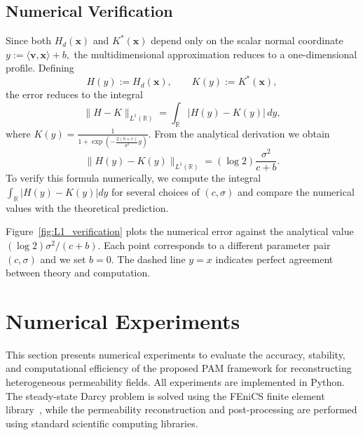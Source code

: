 \documentclass[final,1p,times]{elsarticle}
\theoremstyle{plain}
\theoremstyle{definition}
\theoremstyle{remark}
\newcommand{\bx}{\mathbf{x}}
\newcommand{\bv}{\mathbf{v}}
\begin{document}
\subsection{Numerical Verification}
Since both $H_d(\bx)$ and $K^*(\bx)$ depend only on the scalar normal coordinate $y := \langle \bv,\bx\rangle + b,$ the multidimensional approximation reduces to a one-dimensional profile. Defining
$$
H(y) := H_d(\bx), \qquad K(y) := K^*(\bx),
$$
the error reduces to the integral
\begin{equation}\label{error}
\|H-K\|_{L^1(\mathbb R)}
=
\int_{\mathbb R} |H(y)-K(y)|\,dy,
\end{equation}
where $K(y) = \frac{1}{1+\exp\!\left(-\frac{2(b+c)}{\sigma^2}y\right)}.$ From the analytical derivation we obtain 
\begin{equation}\label{eq:1d_error}
    \|H(y)-K(y)\|_{L^1(\mathbb R)}
=
(\log 2)\frac{\sigma^2}{c+b}.
\end{equation}
To verify this formula numerically, we compute the integral $\int_{\mathbb R}|H(y)-K(y)|dy$ for several choices of
$(c,\sigma)$ and compare the numerical values with the theoretical
prediction.

Figure~\ref{fig:L1_verification} plots the numerical error against the
analytical value $(\log 2)\sigma^2/(c+b)$. Each point corresponds to a
different parameter pair $(c,\sigma)$ and we set $b=0$. The dashed line $y=x$ indicates
perfect agreement between theory and computation.






\section{Numerical Experiments}

This section presents numerical experiments to evaluate the accuracy,
stability, and computational efficiency of the proposed PAM framework
for reconstructing heterogeneous permeability fields. All experiments are implemented in Python. The steady-state Darcy problem is solved using the FEniCS finite element library~\cite{logg2012automated, alnaes2015fenics}, while the permeability reconstruction and post-processing are performed using standard scientific computing libraries.
\end{document}
